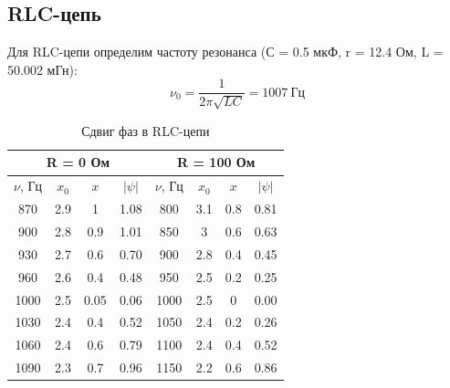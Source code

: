 \documentclass[a4paper, 12pt]{article}%
\begin{document}
	\subsection{RLC-цепь}
	Для RLC-цепи определим частоту резонанса (С = 0.5 мкФ, r = 12.4 Ом, L = 50.002 мГн):
	\begin{equation*}
		\nu_0 = \frac{1}{2\pi \sqrt{LC}} = 1007~ Гц
	\end{equation*}	
	\begin{table}[H]
		\centering
		\begin{tabular}{|cccc|cccc|}
			\hline
			\multicolumn{4}{|c|}{R   = 0 Ом}                                                         & \multicolumn{4}{c|}{R = 100 Ом}                                                        \\ \hline
			\multicolumn{1}{|c|}{$\nu$, Гц}   & \multicolumn{1}{c|}{$x_0$} & \multicolumn{1}{c|}{$x$}    & $|\psi|$  & \multicolumn{1}{c|}{$\nu$, Гц}   & \multicolumn{1}{c|}{$x_0$} & \multicolumn{1}{c|}{$x$}   & $|\psi|$  \\ \hline
			\multicolumn{1}{|c|}{870}  & \multicolumn{1}{c|}{2.9} & \multicolumn{1}{c|}{1}    & 1.08 & \multicolumn{1}{c|}{800}  & \multicolumn{1}{c|}{3.1} & \multicolumn{1}{c|}{0.8} & 0.81 \\ \hline
			\multicolumn{1}{|c|}{900}  & \multicolumn{1}{c|}{2.8} & \multicolumn{1}{c|}{0.9}  & 1.01 & \multicolumn{1}{c|}{850}  & \multicolumn{1}{c|}{3}   & \multicolumn{1}{c|}{0.6} & 0.63 \\ \hline
			\multicolumn{1}{|c|}{930}  & \multicolumn{1}{c|}{2.7} & \multicolumn{1}{c|}{0.6}  & 0.70 & \multicolumn{1}{c|}{900}  & \multicolumn{1}{c|}{2.8} & \multicolumn{1}{c|}{0.4} & 0.45 \\ \hline
			\multicolumn{1}{|c|}{960}  & \multicolumn{1}{c|}{2.6} & \multicolumn{1}{c|}{0.4}  & 0.48 & \multicolumn{1}{c|}{950}  & \multicolumn{1}{c|}{2.5} & \multicolumn{1}{c|}{0.2} & 0.25 \\ \hline
			\multicolumn{1}{|c|}{1000} & \multicolumn{1}{c|}{2.5} & \multicolumn{1}{c|}{0.05} & 0.06 & \multicolumn{1}{c|}{1000} & \multicolumn{1}{c|}{2.5} & \multicolumn{1}{c|}{0}   & 0.00 \\ \hline
			\multicolumn{1}{|c|}{1030} & \multicolumn{1}{c|}{2.4} & \multicolumn{1}{c|}{0.4}  & 0.52 & \multicolumn{1}{c|}{1050} & \multicolumn{1}{c|}{2.4} & \multicolumn{1}{c|}{0.2} & 0.26 \\ \hline
			\multicolumn{1}{|c|}{1060} & \multicolumn{1}{c|}{2.4} & \multicolumn{1}{c|}{0.6}  & 0.79 & \multicolumn{1}{c|}{1100} & \multicolumn{1}{c|}{2.4} & \multicolumn{1}{c|}{0.4} & 0.52 \\ \hline
			\multicolumn{1}{|c|}{1090} & \multicolumn{1}{c|}{2.3} & \multicolumn{1}{c|}{0.7}  & 0.96 & \multicolumn{1}{c|}{1150} & \multicolumn{1}{c|}{2.2} & \multicolumn{1}{c|}{0.6} & 0.86 \\ \hline
		\end{tabular}
	\caption{Сдвиг фаз в RLC-цепи}
	\end{table}
	
\end{document}
